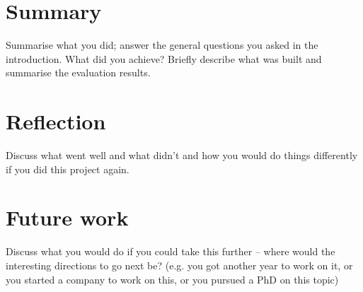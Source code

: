 \documentclass{l4proj}
\begin{document}
\section{Summary}
Summarise what you did; answer the general questions you asked in the introduction. What did you achieve? Briefly describe what was built and summarise the evaluation results.

\section{Reflection}
Discuss what went well and what didn't and how you would do things differently if you did this project again.

\section{Future work}
Discuss what you would do if you could take this further -- where would the interesting directions to go next be? (e.g. you got another year to work on it, or you started a company to work on this, or you pursued a PhD on this topic)

\end{document}
